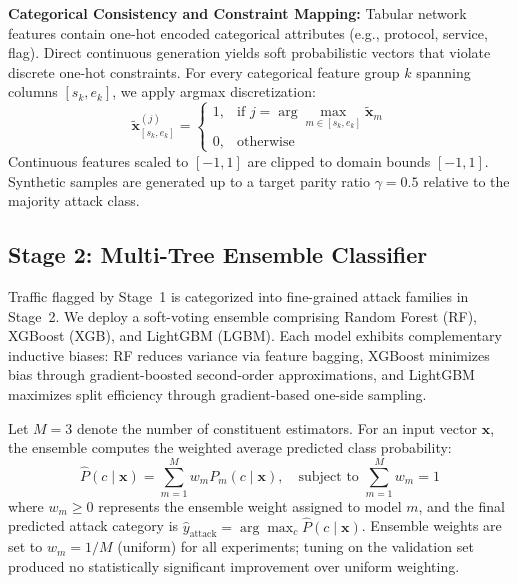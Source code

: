 \documentclass[journal]{IEEEtran}
\begin{document}
\textbf{Categorical Consistency and Constraint Mapping:} Tabular network features contain one-hot encoded categorical attributes (e.g., protocol, service, flag). Direct continuous generation yields soft probabilistic vectors that violate discrete one-hot constraints. For every categorical feature group $k$ spanning columns $[s_k, e_k]$, we apply argmax discretization:
\begin{equation}
\tilde{\mathbf{x}}_{[s_k, e_k]}^{(j)} = 
\begin{cases} 
1, & \text{if } j = \arg\max_{m \in [s_k, e_k]} \tilde{\mathbf{x}}_m \\ 
0, & \text{otherwise}
\end{cases}
\label{eq:onehot_argmax}
\end{equation}
Continuous features scaled to $[-1, 1]$ are clipped to domain bounds $[-1, 1]$. Synthetic samples are generated up to a target parity ratio $\gamma = 0.5$ relative to the majority attack class.

\subsection{Stage 2: Multi-Tree Ensemble Classifier}
Traffic flagged by Stage~1 is categorized into fine-grained attack families in Stage~2. We deploy a soft-voting ensemble comprising Random Forest (RF), XGBoost (XGB), and LightGBM (LGBM). Each model exhibits complementary inductive biases: RF reduces variance via feature bagging, XGBoost minimizes bias through gradient-boosted second-order approximations, and LightGBM maximizes split efficiency through gradient-based one-side sampling.

Let $M = 3$ denote the number of constituent estimators. For an input vector $\mathbf{x}$, the ensemble computes the weighted average predicted class probability:
\begin{equation}
\hat{P}(c \mid \mathbf{x}) = \sum_{m=1}^M w_m P_m(c \mid \mathbf{x}), \quad \text{subject to } \sum_{m=1}^M w_m = 1
\label{eq:ensemble_soft_voting}
\end{equation}
where $w_m \ge 0$ represents the ensemble weight assigned to model $m$, and the final predicted attack category is $\hat{y}_{\text{attack}} = \arg\max_c \hat{P}(c \mid \mathbf{x})$. Ensemble weights are set to $w_m = 1/M$ (uniform) for all experiments; tuning on the validation set produced no statistically significant improvement over uniform weighting.
\end{document}

